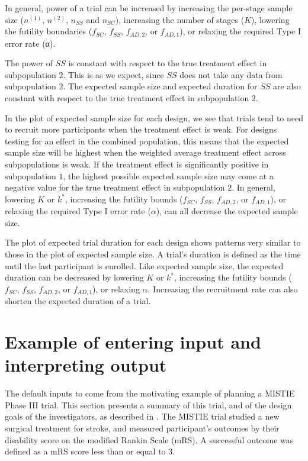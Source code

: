 \documentclass[article]{jss}
\begin{document}
In general, power of a trial can be increased by increasing the per-stage sample size ($n^{(1)}$, $n^{(2)}$, $n_{SS}$ and $n_{SC}$), increasing the number of stages ($K$), lowering the futility boundaries ($f_{SC}$, $f_{SS}$, $f_{AD,2}$, or $f_{AD,1}$), or relaxing the required Type I error rate (α).

The power of $SS$ is constant with respect to the true treatment effect in subpopulation $2$. This is as we expect, since $SS$ does not take any data from subpopulation $2$. The expected sample size and expected duration for $SS$ are also constant with respect to the true treatment effect in subpopulation $2$.

In the plot of expected sample size for each design, we see that trials tend to need to recruit more participants when the treatment effect is weak. For designs testing for an effect in the combined population, this means that the expected sample size will be highest when the weighted average treatment effect across subpopulations is weak. If the treatment effect is significantly positive in subpopulation $1$, the highest possible expected sample size may come at a negative value for the true treatment effect in subpopulation $2$. In general, lowering $K$ or $k^*$, increasing the futility bounds ($f_{SC}$, $f_{SS}$, $f_{AD,2}$, or $f_{AD,1}$), or relaxing the required Type I error rate ($α$), can all decrease the expected sample size.

The plot of expected trial duration for each design shows patterns very similar to those in the plot of expected sample size. A trial's duration is defined as the time until the last participant is enrolled. Like expected sample size, the expected duration can be decreased by lowering $K$ or $k^*$, increasing the futility bounds ($f_{SC}$, $f_{SS}$, $f_{AD,2}$, or $f_{AD,1}$), or relaxing $α$. Increasing the recruitment rate can also shorten the expected duration of a trial.



\section{Example of entering input and interpreting output}
\label{sec:example}

The default inputs to  come from the motivating example of planning a MISTIE Phase III trial. This section presents a summary of this trial, and of the design goals of the investigators, as described in \citep{Rosenblum2013AdaptMISTIE}. The MISTIE trial studied a new surgical treatment for stroke, and measured participant's outcomes by their disability score on the modified Rankin Scale (mRS). A successful outcome was defined as a mRS score less than or equal to 3. 
\end{document}
